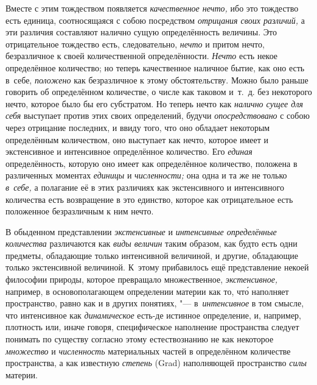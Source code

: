 Вместе с этим тождеством появляется {\em качественное нечто,} ибо это тождество
есть единица, соотносящаяся с собою посредством {\em отрицания своих различий,}
а эти различия составляют налично сущую определённость величины. Это
отрицательное тождество есть, следовательно, {\em нечто} и притом нечто,
безразличное к своей количественной определённости. {\em Нечто} есть некое
определённое количество; но теперь качественное наличное бытие, как оно есть
в~себе, {\em положено} как безразличное к этому обстоятельству. Можно было
раньше говорить об определённом количестве, о числе как таковом и~т.~д. без
некоторого нечто, которое было бы его субстратом. Но теперь нечто как
{\em налично сущее для себя} выступает против этих своих определений, будучи
{\em опосредствовано} с собою через отрицание последних, и ввиду того, что оно
обладает некоторым определённым количеством, оно выступает как нечто, которое
имеет и экстенсивное и интенсивное определённое количество. Его {\em единая}
определённость, которую оно имеет как определённое количество, положена в
различенных моментах {\em единицы} и {\em численности;} она одна и та же не
только {\em в~себе,} а полагание её в этих различиях как экстенсивного и
интенсивного количества есть возвращение в это единство, которое как
отрицательное есть положенное безразличным к ним нечто.


В обыденном представлении {\em экстенсивные} и {\em интенсивные определённые
количества} различаются как {\em виды величин} таким образом, как будто есть
одни предметы, обладающие только интенсивной величиной, и другие, обладающие
только экстенсивной величиной. К~этому прибавилось ещё представление
некоей философии природы, которое превращало множественное,
{\em экстенсивное,} например, в основополагающем определении материи как то, чт\'{о} наполняет
пространство, равно как и в других понятиях, "--- в~{\em интенсивное} в
том смысле, что интенсивное как {\em динамическое} есть-де истинное определение,
и, например, плотность или, иначе говоря, специфическое наполнение пространства
следует понимать по существу согласно этому естествознанию не как некоторое
{\em множество} и {\em численность} материальных частей в определённом
количестве пространства, а как известную {\em степень} (Grad) наполняющей
пространство {\em силы} материи.

